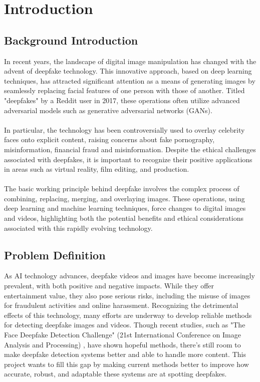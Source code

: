 \chapter{Introduction}
    \section{Background Introduction}
        In recent years, the landscape of digital image manipulation has changed with the advent of deepfake technology.
        This innovative approach, based on deep learning techniques, has attracted significant attention as a means of generating images by seamlessly replacing facial features of one person with those of another.
        Titled "deepfakes" by a Reddit user in 2017, these operations often utilize advanced adversarial models such as generative adversarial networks (GANs). \cite{st2022deep} \\\\
        In particular, the technology has been controversially used to overlay celebrity faces onto explicit content, raising concerns about fake pornography, misinformation, financial fraud and misinformation.
        Despite the ethical challenges associated with deepfakes, it is important to recognize their positive applications in areas such as virtual reality, film editing, and production. \\\\
        The basic working principle behind deepfake involves the complex process of combining, replacing, merging,  and overlaying images.
        These operations, using deep learning and machine learning techniques, force changes to digital images and videos, highlighting both the potential benefits and ethical considerations associated with this rapidly evolving technology.


    \section{Problem Definition}
        As AI technology advances, deepfake videos and images have become increasingly prevalent, with both positive and negative impacts. While they offer entertainment value, they also pose serious risks, including the misuse of images for fraudulent activities and online harassment. Recognizing the detrimental effects of this technology, many efforts are underway to develop reliable methods for detecting deepfake images and videos. Though recent studies, such as "The Face Deepfake Detection Challenge" (21st International Conference on Image Analysis and Processing) \cite{jimaging8100263}, have shown hopeful methods, there's still room to make deepfake detection systems better and able to handle more content. This project wants to fill this gap by making current methods better to improve how accurate, robust, and adaptable these systems are at spotting deepfakes.


